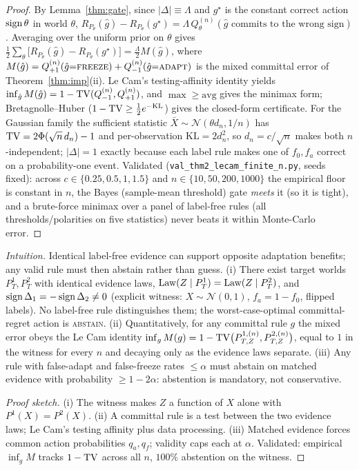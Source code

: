 \begin{proof}
By Lemma~\ref{thm:gate}, since $|\Delta|\equiv\Lambda$ and $g^\star$ is the constant correct
action $\operatorname{sign}\theta$ in world $\theta$,
$R_{P_\theta}(\hat g)-R_{P_\theta}(g^\star)=\Lambda\,Q^{(n)}_\theta(\hat g\text{ commits to the
wrong sign})$. Averaging over the uniform prior on $\theta$ gives
$\tfrac12\sum_\theta\big[R_{P_\theta}(\hat g)-R_{P_\theta}(g^\star)\big]
=\tfrac{\Lambda}{2}M(\hat g)$, where
$M(\hat g)=Q^{(n)}_{+1}(\hat g{=}\textsc{freeze})+Q^{(n)}_{-1}(\hat g{=}\textsc{adapt})$ is the
mixed committal error of Theorem~\ref{thm:imp}(ii). Le Cam's testing-affinity identity yields
$\inf_{\hat g}M(\hat g)=1-\mathrm{TV}(Q^{(n)}_{-1},Q^{(n)}_{+1})$, and $\max\ge\mathrm{avg}$ gives the
minimax form; Bretagnolle--Huber ($1-\mathrm{TV}\ge\tfrac12 e^{-\mathrm{KL}}$) gives the closed-form
certificate. For the Gaussian family the sufficient statistic $\bar X\sim\mathcal N(\theta
d_n,1/n)$ has $\mathrm{TV}=2\Phi(\sqrt n\,d_n)-1$ and per-observation
$\mathrm{KL}=2d_n^2$, so $d_n=c/\sqrt n$ makes both $n$-independent; $|\Delta|=1$ exactly because
each label rule makes one of $f_0,f_a$ correct on a probability-one event.
Validated (\texttt{val\_thm2\_lecam\_finite\_n.py}, seeds fixed): across $c\in\{0.25,0.5,1,1.5\}$
and $n\in\{10,50,200,1000\}$ the empirical floor is constant in $n$, the Bayes (sample-mean
threshold) gate \emph{meets} it (so it is tight), and a brute-force minimax over a panel of
label-free rules (all thresholds/polarities on five statistics) never beats it within
Monte-Carlo error.
\end{proof}

\begin{theorem}\label{thm:imp}\label{thm:imp-quant}\label{cor:forced-abstain}
\emph{Intuition.} Identical label-free evidence can support opposite adaptation benefits; any
valid rule must then abstain rather than guess.
\textnormal{(i)} There exist target worlds $P_T^1,P_T^2$ with identical evidence laws,
$\mathrm{Law}(Z\mid P_T^1)=\mathrm{Law}(Z\mid P_T^2)$, and $\operatorname{sign}\Delta_1=-\operatorname{sign}\Delta_2\neq0$
(explicit witness: $X\sim\mathcal N(0,1)$, $f_a=1-f_0$, flipped labels). No label-free
rule distinguishes them; the worst-case-optimal committal-regret action is
\textsc{abstain}.
\textnormal{(ii)} Quantitatively, for any committal rule $g$ the mixed error obeys the
Le Cam identity $\inf_g M(g)=1-\mathrm{TV}\big(P^{1,(n)}_{T,Z},P^{2,(n)}_{T,Z}\big)$, equal to
$1$ in the witness for every $n$ and decaying only as the evidence laws separate.
\textnormal{(iii)} Any rule with false-adapt and false-freeze rates $\le\alpha$ must
abstain on matched evidence with probability $\ge1-2\alpha$: abstention is mandatory,
not conservative.
\end{theorem}
\begin{proof}[Proof sketch]
(i) The witness makes $Z$ a function of $X$ alone with $P^1(X)=P^2(X)$. (ii) A committal
rule is a test between the two evidence laws; Le Cam's testing affinity plus data
processing. (iii) Matched evidence forces common action probabilities $q_a,q_f$;
validity caps each at $\alpha$. Validated: empirical $\inf_g M$ tracks $1-\mathrm{TV}$ across
all $n$, $100\%$ abstention on the witness.
\end{proof}

